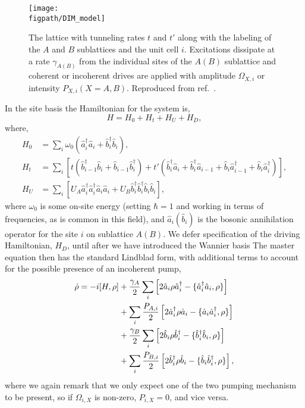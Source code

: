 \begin{figure}[ht!]
\centering
\texttt{[image: \\figpath/DIM\_model]}
\caption{The lattice with tunneling rates \(t\) and \(t'\) along with the labeling of the \(A\) and \(B\) sublattices and the unit cell \(i\). Excitations dissipate at a rate \(\gamma_{A(B)}\) from the individual sites of the \(A (B)\) sublattice and coherent or incoherent drives are applied with amplitude \(\Omega_{X, i}\) or intensity \(P_{X, i}(X = A,B)\). Reproduced from ref.~\cite{OBH17}.}
\label{fig:dim1-1}
\end{figure}

In the site basis the Hamiltonian for the system is,
\begin{equation}
	H = H_{0} + H_{t} + H_{U} + H_{D},
	\label{eq:dim1-1}
\end{equation}
where,
	\begin{align}
		H_{0} &= \sum_{i} \omega_{0}(\hat{a}_{i}^{\dagger}\hat{a}_{i} + \hat{b}_{i}^{\dagger}\hat{b}_{i}), \label{eq:dim1-2} \\
		H_{t} &= \sum_{i} \left[ t(\hat{b}_{i-1}^{\dagger}\hat{b}_{i} + \hat{b}_{i-1}\hat{b}_{i}^{\dagger}) + t'(\hat{b}_{i}^{\dagger}\hat{a}_{i} + \hat{b}_{i}^{\dagger}\hat{a}_{i-1} + \hat{b}_{i}\hat{a}_{i-1}^{\dagger} + \hat{b}_{i}\hat{a}_{i}^{\dagger})\right], \label{eq:dim1-3} \\
		H_{U} &= \sum_{i} \left[ U_{A}\hat{a}_{i}^{\dagger}\hat{a}_{i}^{\dagger}\hat{a}_{i}\hat{a}_{i} + U_{B}\hat{b}_{i}^{\dagger}\hat{b}_{i}^{\dagger}\hat{b}_{i}\hat{b}_{i}\right], \label{eq:dim1-4}
	\end{align}
	where \(\omega_{0}\) is some on-site energy (setting \(\hbar=1\) and working in terms of frequencies, as is common in this field), and \(\hat{a}_{i} (\hat{b}_{i})\) is the bosonic annihilation operator for the site \(i\) on sublattice \(A(B)\). We defer specification of the driving Hamiltonian, \(H_{D}\), until after we have introduced the Wannier basis The master equation then has the standard Lindblad form, with additional terms to account for the possible presence of an incoherent pump,
	\begin{align}
		\dot{\rho} = -i[H, \rho] &+ \frac{\gamma_{A}}{2}\sum_{i}\left[ 2\hat{a}_{i}\rho\hat{a}_{i}^{\dagger} - \{\hat{a}_{i}^{\dagger}\hat{a}_{i}, \rho\} \right] \notag \\
		&+ \sum_{i} \frac{P_{A,i}}{2} \left[2\hat{a}_{i}^{\dagger}\rho\hat{a}_{i} - \{\hat{a}_{i}\hat{a}_{i}^{\dagger}, \rho\} \right] \notag \\
		&+ \frac{\gamma_{B}}{2} \sum_{i} \left[ 2\hat{b}_{i}\rho\hat{b}_{i}^{\dagger} - \{\hat{b}_{i}^{\dagger}\hat{b}_{i}, \rho\} \right] \notag \\
		&+ \sum_{i} \frac{P_{B,i}}{2} \left[ 2\hat{b}_{i}^{\dagger}\rho\hat{b}_{i} - \{\hat{b}_{i}\hat{b}_{i}^{\dagger}, \rho\} \right], 
		\label{eq:dim1-6}
	\end{align}
where we again remark that we only expect one of the two pumping mechanism to be present, so if \(\Omega_{i,X}\) is non-zero, \(P_{i,X} = 0\), and vice versa.

